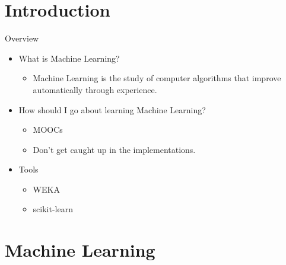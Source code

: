 \section{Introduction}\label{introduction}

\begin{frame}{Overview}

\begin{itemize}
\itemsep1pt\parskip0pt
\item
  What is Machine Learning?

  \begin{itemize}
  \itemsep1pt\parskip0pt
  \item
    Machine Learning is the study of computer algorithms that improve
    automatically through experience.
  \end{itemize}
\item
  How should I go about learning Machine Learning?

  \begin{itemize}
  \itemsep1pt\parskip0pt
  \item
    MOOCs
  \item
    Don't get caught up in the implementations.
  \end{itemize}
\item
  Tools

  \begin{itemize}
  \itemsep1pt\parskip0pt
  \item
    WEKA
  \item
    scikit-learn
  \end{itemize}
\end{itemize}

\end{frame}

\section{Machine Learning}\label{machine-learning}

